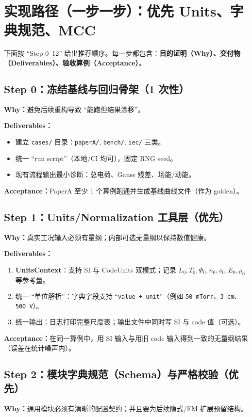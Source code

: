 \documentclass[11pt,a4paper]{ctexart}
\begin{document}
\section{实现路径（一步一步）：优先 Units、字典规范、MCC}
下面按 ``Step 0--12'' 给出推荐顺序。每一步都包含：\textbf{目的证明（Why）、交付物（Deliverables）、验收算例（Acceptance）}。

\subsection*{Step 0：冻结基线与回归骨架（1 次性）}
\textbf{Why：}避免后续重构导致 ``能跑但结果漂移''。

\textbf{Deliverables：}
\begin{itemize}[leftmargin=2em]
\item 建立 \texttt{cases/} 目录：\texttt{paperA/}, \texttt{bench/}, \texttt{iec/} 三类。
\item 统一 ``run script''（本地/CI 均可），固定 RNG seed。
\item 现有流程输出最小诊断：总电荷、Gauss 残差、场能/动能。
\end{itemize}
\textbf{Acceptance：}PaperA 至少 1 个算例跑通并生成基线曲线文件（作为 golden）。

\subsection*{Step 1：Units/Normalization 工具层（优先）}
\textbf{Why：}真实工况输入必须有量纲；内部可选无量纲以保持数值健康。

\textbf{Deliverables：}
\begin{enumerate}[leftmargin=2em]
\item \textbf{UnitsContext}：支持 SI 与 CodeUnits 双模式；记录 $L_0,T_0,\Phi_0,n_0,v_0,E_0,\rho_0$ 等参考量。
\item 统一 ``单位解析''：字典字段支持 ``\texttt{value + unit}''（例如 \texttt{50 mTorr}、\texttt{3 cm}、\texttt{500 V}）。
\item 统一输出：日志打印完整尺度表；输出文件中同时写 SI 与 code 值（可选）。
\end{enumerate}
\textbf{Acceptance：}在同一算例中，用 SI 输入与用旧 code 输入得到一致的无量纲结果（误差在统计噪声内）。

\subsection*{Step 2：模块字典规范（Schema）与严格校验（优先）}
\textbf{Why：}通用模块必须有清晰的配置契约；并且要为后续隐式/EM 扩展预留结构。
\end{document}
